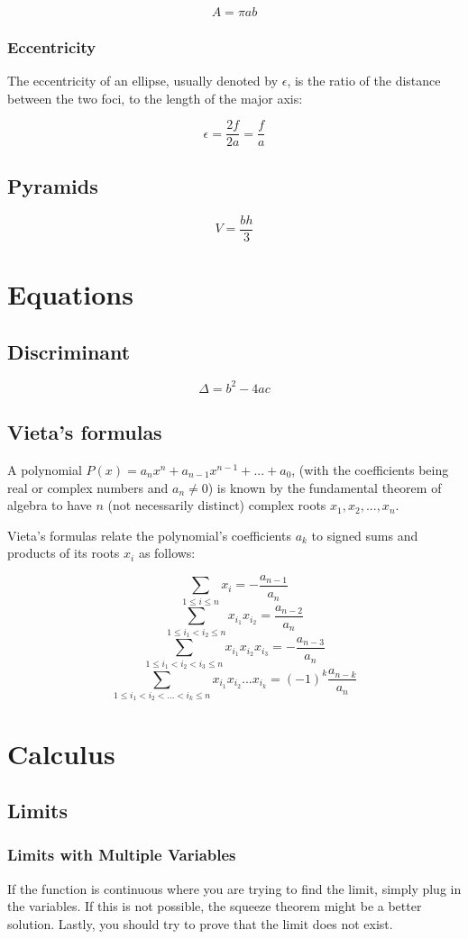 \documentclass[oneside]{book}
\begin{document}
\[A = \pi a b\]

\subsection{Eccentricity}
The eccentricity of an ellipse, usually denoted by \(\epsilon\), is the ratio of
the distance between the two foci, to the length of the major axis:

\[\epsilon = \frac{2f}{2a} = \frac{f}{a}\]

\section{Pyramids}
\[V = \frac{bh}{3}\]

\chapter{Equations}
\section{Discriminant}
\[\Delta = b^2 - 4ac\]

\section{Vieta's formulas}
A polynomial \(P(x) = a_n x^n + a_{n-1} x^{n-1} + ... + a_0\), (with the
coefficients being real or complex numbers and \(a_n \neq 0\)) is known by the
fundamental theorem of algebra to have \(n\) (not necessarily distinct) complex
roots \(x_1, x_2, ..., x_n\).

Vieta's formulas relate the polynomial's coefficients \(a_k\) to signed sums
and products of its roots \(x_i\) as follows:

\[\sum_{1 \le i \le n} x_i = - \frac{a_{n-1}}{a_n}\]
\[\sum_{1 \le i_1 < i_2 \le n} x_{i_1} x_{i_2} = \frac{a_{n-2}}{a_n}\]
\[\sum_{1 \le i_1 < i_2 < i_3 \le n} x_{i_1} x_{i_2} x_{i_3} = -
\frac{a_{n-3}}{a_n}\]
\[\sum_{1 \le i_1 < i_2 < ... < i_k \le n} x_{i_1} x_{i_2} ... x_{i_k} = (-1)^k
\frac{a_{n-k}}{a_n}\]

\chapter{Calculus}
\section{Limits}
\subsection{Limits with Multiple Variables}
If the function is continuous where you are trying to find the limit, simply
plug in the variables. If this is not possible, the squeeze theorem might be a
better solution. Lastly, you should try to prove that the limit does not exist.
\end{document}
